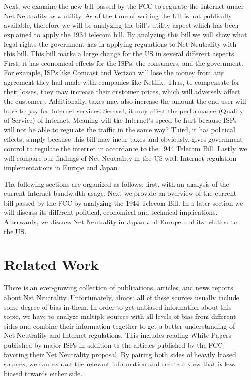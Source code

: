 \documentclass{sigcomm-alternate}
\begin{document}
Next, we examine the new bill passed by the FCC to regulate the Internet under Net Neutrality as a utility. As of the time of writing the bill is not publically available, therefore we will be analyzing the bill’s utility aspect which has been explained to apply the 1934 telecom bill.  By analyzing this bill we will show what legal rights the government has in applying regulations to Net Neutrality with this bill. This bill marks a large change for the US in several different aspects. First, it has economical effects for the ISPs, the consumers, and the government. For example, ISPs like Comcast and Verizon will lose the money from any agreement they had made with companies like Netflix.  Thus, to compensate for their losses, they may increase their customer prices, which will adversely affect the customer \cite{inthenews}. Additionally, taxes may also increase the amount the end user will have to pay for Internet services. Second, it may affect the performance (Quality of Service) of Internet. Meaning will the Internet’s speed be hurt because ISPs will not be able to regulate the traffic in the same way? Third, it has political effects; simply because this bill may incur taxes and obviously, gives government control to regulate the internet in accordance to the 1944 Telecom Bill. Lastly, we will compare our findings of Net Neutrality in the US with Internet regulation implementations in Europe and Japan.

The following sections are organized as follows: first, with an analysis of the current Internet bandwidth usage. Next we provide an overview of the current bill passed by the FCC by analyzing the 1944 Telecom Bill. In a later section we will discuss its different political, economical and technical implications. Afterwards, we discuss Net Neutrality in Japan and Europe and its relation to the US.


\section{Related Work}
There is an ever-growing collection of publications, articles, and news reports about Net Neutrality. Unfortunately, almost all of these sources usually include some degree of bias in them. In order to get unbiased information about this topic, we have to analyze multiple sources with all levels of bias from different sides and combine their information together to get a better understanding of Net Neutrality and Internet regulations. This includes reading White Papers published by major ISPs in addition to the articles published by the FCC favoring their Net Neutrality proposal. By pairing both sides of heavily biased sources, we can extract the relevant information and create a view that is less biased towards either side. 
\end{document}
